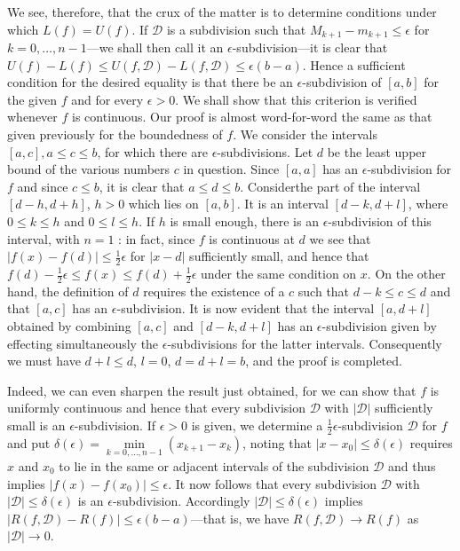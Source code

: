 We see, therefore, that the crux of the matter is to determine
conditions under which $L(f) = U (f)$. If $\mathscr{D}$ is a
subdivision such that $M_{k+1} - m_{k+1} \leqslant \epsilon$ for $k=0,
\ldots, n - 1$---we shall then call it an $\epsilon$-subdivision---it
is clear that $U(f)-L(f) \leqslant U (f,\mathscr{D}) -
L(f,\mathscr{D}) \leqslant \epsilon (b-a)$. Hence a sufficient
condition for the desired equality is that there be an
$\epsilon$-subdivision of $[a,b]$ for the given $f$ and for every
$\epsilon > 0$. We shall show that this criterion is verified whenever
$f$ is continuous. Our proof is almost word-for-word the same as that
given previously for the boundedness of $f$. We consider the intervals
$[a,c], a \leqslant c \leqslant b$, for which there are
$\epsilon$-subdivisions. Let $d$ be the least upper bound of the
various numbers $c$ in question. Since $[a,a]$ has an
$\epsilon$-subdivision for $f$ and since $c \leqslant b$, it is clear
that $a \leqslant d \leqslant b$. Consider\pageoriginale the part of
the interval $[d- h, d + h]$, $h >0$ which lies on $[a,b]$. It is an
interval $[d-k, d+l]$, where $0\leqslant k \leqslant h$ and $0
\leqslant l \leqslant h$. If $h$ is small enough, there is an
$\epsilon$-subdivision of this interval, with $n=1$ : in fact, since
$f$ is continuous at $d$ we see that $|f(x) - f(d)| \leqslant
\frac{1}{2} \epsilon$  for $|x-d|$ sufficiently small, and hence that
$f(d) - \frac{1}{2} \epsilon \leqslant f (x) \leqslant f(d) +
\frac{1}{2} \epsilon$ under the same condition on $x$. On the other
hand, the definition of $d$ requires the existence of a $c$ such that
$d - k \leqslant c \leqslant d$ and that $[a,c]$ has an
$\epsilon$-subdivision. It is now evident that the interval $[a, d
  +l]$ obtained by combining $[a,c]$ and $[d-k, d+l]$ has an
$\epsilon$-subdivision given by effecting simultaneously the
$\epsilon$-subdivisions for the latter intervals. Consequently we must
have $d+l \leqslant d$, $l=0$, $d = d+ l = b$, and the proof is completed.


Indeed, we can even sharpen the result just obtained, for we can show
that $f$ is uniformly continuous and hence that every subdivision
$\mathscr{D}$ with $|\mathscr{D}|$ sufficiently small is an
$\epsilon$-subdivision. If $\epsilon > 0$ is given, we determine a
$\frac{1}{2} \epsilon$-subdivision $\mathscr{D}$ for $f$ and put
$\delta (\epsilon) = \min\limits_{k=0,\ldots, n-1} (x_{k+1} - x_k)$,
noting that $|x-x_0| \leqslant \delta(\epsilon)$ requires $x$ and
$x_0$ to lie in the same or adjacent intervals of the subdivision
$\mathscr{D}$ and thus implies $|f(x) - f(x_0)| \leqslant
\epsilon$. It now follows that every subdivision $\mathscr{D}$ with
$|\mathscr{D}| \leqslant \delta (\epsilon)$ is an
$\epsilon$-subdivision. Accordingly $|\mathscr{D}| \leqslant \delta
(\epsilon)$ implies $|R(f,\mathscr{D}) - R(f)| \leqslant \epsilon (b
-a)$---that is, we have $R(f,\mathscr{D}) \to R (f)$ as
$|\mathscr{D}| \to 0$.

